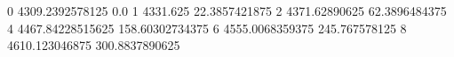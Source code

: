 0 4309.2392578125 0.0
1 4331.625 22.3857421875
2 4371.62890625 62.3896484375
4 4467.84228515625 158.60302734375
6 4555.0068359375 245.767578125
8 4610.123046875 300.8837890625
